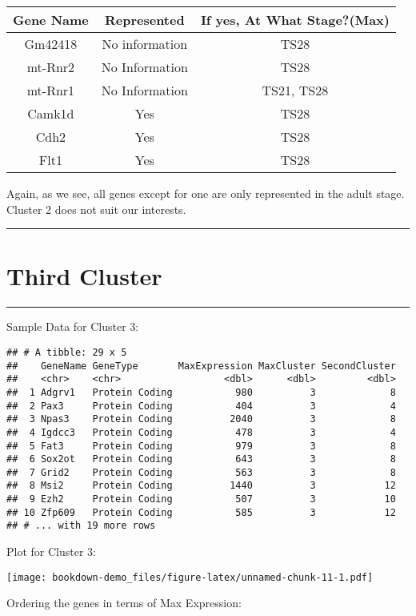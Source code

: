 \documentclass[
]{book}
\begin{document}
\begin{longtable}[]{@{}ccc@{}}
\toprule
Gene Name & Represented & If yes, At What Stage?(Max)\tabularnewline
\midrule
\endhead
Gm42418 & No information & TS28\tabularnewline
mt-Rnr2 & No Information & TS28\tabularnewline
mt-Rnr1 & No Information & TS21, TS28\tabularnewline
Camk1d & Yes & TS28\tabularnewline
Cdh2 & Yes & TS28\tabularnewline
Flt1 & Yes & TS28\tabularnewline
\bottomrule
\end{longtable}

Again, as we see, all genes except for one are only represented in the adult stage. Cluster 2 does not suit our interests.

\begin{center}\rule{0.5\linewidth}{0.5pt}\end{center}

\hypertarget{third-cluster}{%
\chapter{Third Cluster}\label{third-cluster}}

\begin{center}\rule{0.5\linewidth}{0.5pt}\end{center}

Sample Data for Cluster 3:

\begin{verbatim}
## # A tibble: 29 x 5
##    GeneName GeneType       MaxExpression MaxCluster SecondCluster
##    <chr>    <chr>                  <dbl>      <dbl>         <dbl>
##  1 Adgrv1   Protein Coding           980          3             8
##  2 Pax3     Protein Coding           404          3             4
##  3 Npas3    Protein Coding          2040          3             8
##  4 Igdcc3   Protein Coding           478          3             4
##  5 Fat3     Protein Coding           979          3             8
##  6 Sox2ot   Protein Coding           643          3             8
##  7 Grid2    Protein Coding           563          3             8
##  8 Msi2     Protein Coding          1440          3            12
##  9 Ezh2     Protein Coding           507          3            10
## 10 Zfp609   Protein Coding           585          3            12
## # ... with 19 more rows
\end{verbatim}

Plot for Cluster 3:

\texttt{[image: bookdown-demo\_files/figure-latex/unnamed-chunk-11-1.pdf]}

Ordering the genes in terms of Max Expression:
\end{document}
